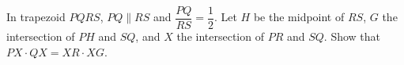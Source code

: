 In trapezoid $PQRS$, $PQ\parallel RS$ and $\dfrac{PQ}{RS}=\dfrac{1}{2}$. Let $H$ be the midpoint of $RS$, $G$ the intersection of $PH$ and $SQ$, and $X$ the intersection of $PR$ and $SQ$. Show that $PX\cdot QX=XR\cdot XG$.
